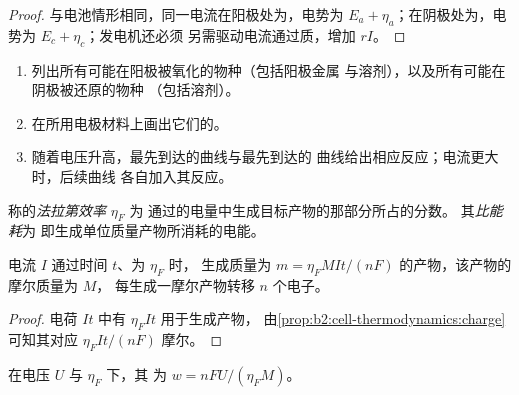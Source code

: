 \begin{proof}
与电池情形相同，同一电流在阳极处为，电势为 $E_a +
\eta_a$；在阴极处为，电势为 $E_c + \eta_c$；发电机还必须
另需驱动电流通过质，增加 $rI$。
\end{proof}

\begin{method}[预测电解过程]\label{met:b2:batteries-electrolysis:predict-electrolysis}
\begin{enumerate}
  \item 列出所有可能在阳极被氧化的物种（包括阳极金属
        与溶剂），以及所有可能在阴极被还原的物种
        （包括溶剂）。
  \item 在所用电极材料上画出它们的。
  \item 随着电压升高，最先到达的曲线与最先到达的
        曲线给出相应反应；电流更大时，后续曲线
        各自加入其反应。
\end{enumerate}
\end{method}

\begin{definition}[法拉第效率]\label{def:b2:batteries-electrolysis:faradaic-efficiency}
称的\emph{法拉第效率} $\eta_F$ 为
通过的电量中生成目标产物的那部分所占的分数。
其\emph{比能耗}为
即生成单位质量产物所消耗的电能。
\end{definition}

\begin{proposition}[法拉第电磁感应定律]\label{prop:b2:batteries-electrolysis:faraday-mass}
电流 $I$ 通过时间 $t$、为 $\eta_F$ 时，
生成质量为 $m = \eta_F MIt/(nF)$ 的产物，该产物的摩尔质量为 $M$，
每生成一摩尔产物转移 $n$ 个电子。
\end{proposition}

\begin{proof}
电荷 $It$ 中有 $\eta_F It$ 用于生成产物，
由\cref{prop:b2:cell-thermodynamics:charge}可知其对应 $\eta_F It/(nF)$ 摩尔。
\end{proof}

\begin{proposition}[每千克能耗]\label{prop:b2:batteries-electrolysis:energy}
在电压 $U$ 与 $\eta_F$ 下，其
为 $w = nFU/(\eta_F M)$。
\end{proposition}

